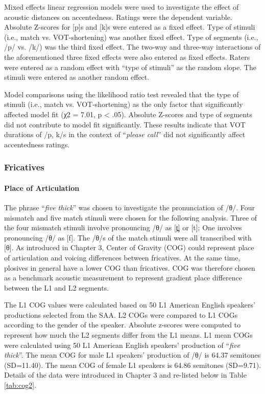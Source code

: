 Mixed effects linear regression models were used to investigate the effect of acoustic distances on accentedness. Ratings were the dependent variable. Absolute Z-scores for [p]s and [k]s were entered as a fixed effect. Type of stimuli (i.e., match vs. VOT-shortening) was another fixed effect. Type of segments (i.e., /p/ vs. /k/) was the third fixed effect. The two-way and three-way interactions of the aforementioned three fixed effects were also entered as fixed effects. Raters were entered as a random effect with “type of stimuli” as the random slope. The stimuli were entered as another random effect. 

Model comparisons using the likelihood ratio test revealed that the type of stimuli (i.e., match vs. VOT-shortening) as the only factor that significantly affected model fit (χ2 = 7.01, p < .05). Absolute Z-scores and type of segments did not contribute to model fit significantly. These results indicate that VOT durations of /p, k/s in the context of “\textit{please call}” did not significantly affect accentedness ratings. 

\subsubsection{Fricatives}
\paragraph{Place of Articulation}

The phrase “\textit{five thick}” was chosen to investigate the pronunciation of /θ/. Four mismatch and five match stimuli were chosen for the following analysis. Three of the four mismatch stimuli involve pronouncing /θ/ as [t̪] or [t]; One involves pronouncing /θ/ as [f]. The /θ/s of the match stimuli were all transcribed with [θ]. As introduced in Chapter 3, Center of Gravity (COG) could represent place of articulation and voicing differences between fricatives. At the same time, plosives in general have a lower COG than fricatives. COG was therefore chosen as a benchmark acoustic measurement to represent gradient place difference between the L1 and L2 segments. 

The L1 COG values were calculated based on 50 L1 American English speakers’ productions selected from the SAA. L2 COGs were compared to L1 COGs according to the gender of the speaker. Absolute z-scores were computed to represent how much the L2 segments differ from the L1 means. L1 mean COGs were calculated using 50 L1 American English speakers’ production of “\textit{five thick}”. The mean COG for male L1 speakers’ production of /θ/ is 64.37 semitones (SD=11.40). The mean COG of female L1 speakers is 64.86 semitones (SD=9.71). Details of the data were introduced in Chapter 3 and re-listed below in Table \ref{tab:cog2}.


